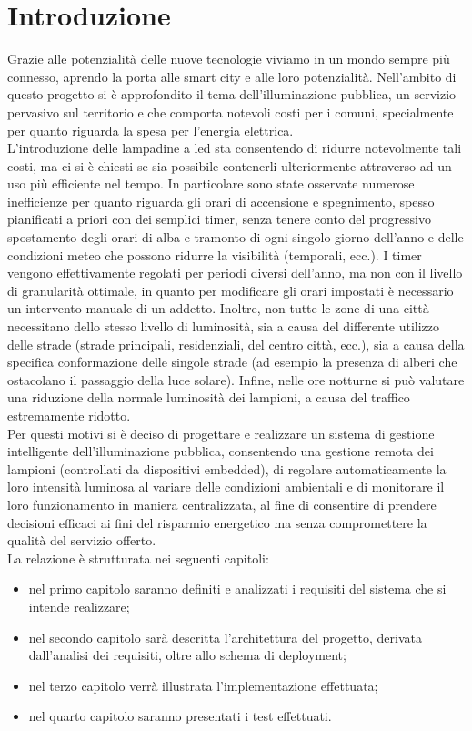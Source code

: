 \chapter{Introduzione}

Grazie alle potenzialità delle nuove tecnologie viviamo in un mondo sempre più connesso, aprendo la porta alle smart city e alle loro potenzialità.
Nell'ambito di questo progetto si è approfondito il tema dell'illuminazione pubblica, un servizio pervasivo sul territorio e che comporta notevoli costi per i comuni, specialmente per quanto riguarda la spesa per l'energia elettrica.
\\L'introduzione delle lampadine a led sta consentendo di ridurre notevolmente tali costi, ma ci si è chiesti se sia possibile contenerli ulteriormente attraverso ad un uso più efficiente nel tempo.
In particolare sono state osservate numerose inefficienze per quanto riguarda gli orari di accensione e spegnimento, spesso pianificati a priori con dei semplici timer, senza tenere conto del progressivo spostamento degli orari di alba e tramonto di ogni singolo giorno dell'anno e delle condizioni meteo che possono ridurre la visibilità (temporali, ecc.).
I timer vengono effettivamente regolati per periodi diversi dell'anno, ma non con il livello di granularità ottimale, in quanto per modificare gli orari impostati è necessario un intervento manuale di un addetto.
Inoltre, non tutte le zone di una città necessitano dello stesso livello di luminosità, sia a causa del differente utilizzo delle strade (strade principali, residenziali, del centro città, ecc.), sia a causa della specifica conformazione delle singole strade (ad esempio la presenza di alberi che ostacolano il passaggio della luce solare).
Infine, nelle ore notturne si può valutare una riduzione della normale luminosità dei lampioni, a causa del traffico estremamente ridotto.
\\Per questi motivi si è deciso di progettare e realizzare un sistema di gestione intelligente dell'illuminazione pubblica, consentendo una gestione remota dei lampioni (controllati da dispositivi embedded), di regolare automaticamente la loro intensità luminosa al variare delle condizioni ambientali e di monitorare il loro funzionamento in maniera centralizzata, al fine di consentire di prendere decisioni efficaci ai fini del risparmio energetico ma senza compromettere la qualità del servizio offerto.
\\La relazione è strutturata nei seguenti capitoli:
\begin{itemize}
 \item nel primo capitolo saranno definiti e analizzati i requisiti del sistema che si intende realizzare;
 \item nel secondo capitolo sarà descritta l'architettura del progetto, derivata dall'analisi dei requisiti, oltre allo schema di deployment;
 \item nel terzo capitolo verrà illustrata l'implementazione effettuata;
 \item nel quarto capitolo saranno presentati i test effettuati.
\end{itemize}
